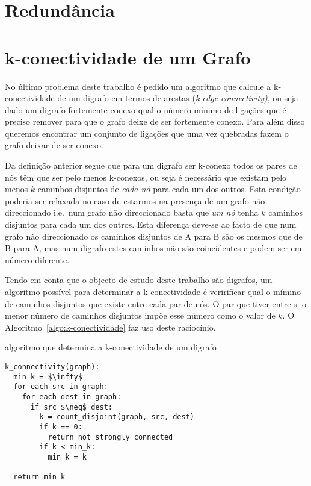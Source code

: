 \documentclass[10pt,a4paper]{article}
\begin{document}
\section{Redundância}

\section{k-conectividade de um Grafo}
No último problema deste trabalho é pedido um algoritmo que calcule a k-conectividade de um digrafo em termos de arestas (\textit{k-edge-connectivity)}, ou seja dado um digrafo fortemente conexo qual o número mínimo de ligações que é preciso remover para que o grafo deixe de ser fortemente conexo. Para além disso queremos encontrar um conjunto de ligações que uma vez quebradas fazem o grafo deixar de ser conexo.

Da definição anterior segue que para um digrafo ser k-conexo todos os pares de nós têm que ser pelo menos k-conexos, ou seja é necessário que existam pelo menos $k$ caminhos disjuntos de \emph{cada nó} para cada um dos outros. Esta condição poderia ser relaxada no caso de estarmos na presença de um grafo não direccionado i.e.\ num grafo não direccionado basta que \emph{um nó} tenha $k$ caminhos disjuntos para cada um dos outros. Esta diferença deve-se ao facto de que num grafo não direccionado os caminhos disjuntos de A para B são os mesmos que de B para A, mas num digrafo estes caminhos não são coincidentes e podem ser em número diferente.

Tendo em conta que o objecto de estudo deste trabalho são digrafos, um algoritmo possível para determinar a k-conectividade é veririficar qual o mímino de caminhos disjuntos que existe entre cada par de nós. O par que tiver entre si o menor número de caminhos disjuntos impõe esse número como o valor de $k$. O Algoritmo~\ref{algo:k-conectividade} faz uso deste raciocínio.

\begin{algorithm}[h]
\caption{algoritmo que determina a k-conectividade de um digrafo}
\label{algo:k-conectividade}
\begin{lstlisting}[linewidth=0.95\linewidth, mathescape]
k_connectivity(graph):
  min_k = $\infty$
  for each src in graph:
    for each dest in graph:
      if src $\neq$ dest:
        k = count_disjoint(graph, src, dest)
        if k == 0:
          return not strongly connected
        if k < min_k:
          min_k = k

  return min_k
\end{lstlisting}
\end{algorithm}
\end{document}
